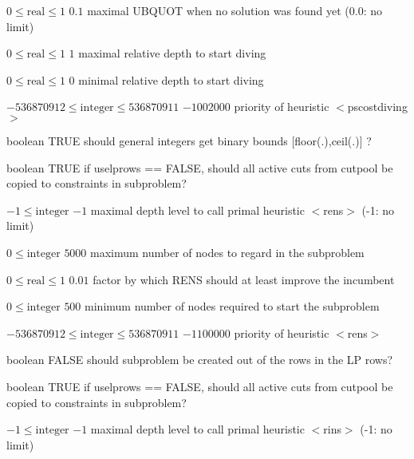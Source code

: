 %
{$0\leq\textrm{real}\leq1$}%
{$0.1$}%
{maximal UBQUOT when no solution was found yet (0.0: no limit)}%
{}

%
{$0\leq\textrm{real}\leq1$}%
{$1$}%
{maximal relative depth to start diving}%
{}

%
{$0\leq\textrm{real}\leq1$}%
{$0$}%
{minimal relative depth to start diving}%
{}

%
{$-536870912\leq\textrm{integer}\leq536870911$}%
{$-1002000$}%
{priority of heuristic $<$pscostdiving$>$}%
{}

%
{boolean}%
{TRUE}%
{should general integers get binary bounds [floor(.),ceil(.)] ?}%
{}

%
{boolean}%
{TRUE}%
{if uselprows == FALSE, should all active cuts from cutpool be copied to constraints in subproblem?}%
{}

%
{$-1\leq\textrm{integer}$}%
{$-1$}%
{maximal depth level to call primal heuristic $<$rens$>$ (-1: no limit)}%
{}

%
{$0\leq\textrm{integer}$}%
{$5000$}%
{maximum number of nodes to regard in the subproblem}%
{}

%
{$0\leq\textrm{real}\leq1$}%
{$0.01$}%
{factor by which RENS should at least improve the incumbent  }%
{}

%
{$0\leq\textrm{integer}$}%
{$500$}%
{minimum number of nodes required to start the subproblem}%
{}

%
{$-536870912\leq\textrm{integer}\leq536870911$}%
{$-1100000$}%
{priority of heuristic $<$rens$>$}%
{}

%
{boolean}%
{FALSE}%
{should subproblem be created out of the rows in the LP rows?}%
{}

%
{boolean}%
{TRUE}%
{if uselprows == FALSE, should all active cuts from cutpool be copied to constraints in subproblem?}%
{}

%
{$-1\leq\textrm{integer}$}%
{$-1$}%
{maximal depth level to call primal heuristic $<$rins$>$ (-1: no limit)}%
{}

